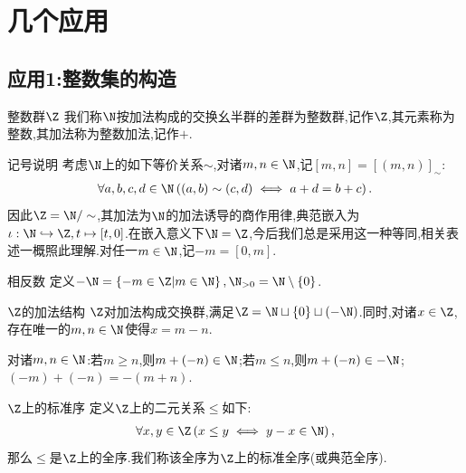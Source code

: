 \section{几个应用}

\subsection*{应用1:整数集的构造}

\begin{definition}{整数群$\Z$}{}
	我们称$\N$按加法构成的交换幺半群的差群为整数群,记作$\Z$,其元素称为整数,其加法称为整数加法,记作$+$.
\end{definition}

\begin{remark}{记号说明}{}
	考虑$\N$上的如下等价关系$\sim$,对诸$m,n\in\N$,记$\left[m,n\right]=\left[\left(m,n\right)\right]_{\sim}$:
	\begin{align*}
		\forall a,b,c,d\in\N\left(\left(a,b\right)\sim\left(c,d\right)\iff a+d=b+c\right).
	\end{align*}
	因此$\Z=\N/\sim$,其加法为$\N$的加法诱导的商作用律,典范嵌入为$\iota:\N\hookrightarrow\Z,t\mapsto\left[t,0\right]$.在嵌入意义下$\N=\Z$,今后我们总是采用这一种等同,相关表述一概照此理解.对任一$m\in\N$,记$-m=\left[0,m\right]$.
\end{remark}

\begin{definition}{相反数}{}
	定义$-\N=\left\{-m\in\Z\middle|m\in\N\right\},\N_{>0}=\N\setminus\left\{0\right\}$.
\end{definition}

\begin{proposition}{$\Z$的加法结构}{}
	$\Z$对加法构成交换群,满足$\Z=\N\sqcup\left\{0\right\}\sqcup\left(-\N\right)$.同时,对诸$x\in\Z$,存在唯一的$m,n\in\N$使得$x=m-n$.
\end{proposition}

\begin{corollary}{}{}
	对诸$m,n\in\N$:若$m\geq n$,则$m+\left(-n\right)\in\N$;若$m\leq n$,则$m+\left(-n\right)\in -\N$;$\left(-m\right)+\left(-n\right)=-\left(m+n\right)$.
\end{corollary}

\begin{definition}{$\Z$上的标准序}{}
	定义$\Z$上的二元关系$\leq$如下:
	\begin{align*}
		\forall x,y\in\Z\left(x\leq y\iff y-x\in\N\right),
	\end{align*}
	那么$\leq$是$\Z$上的全序.我们称该全序为$\Z$上的标准全序(或典范全序).
\end{definition}

